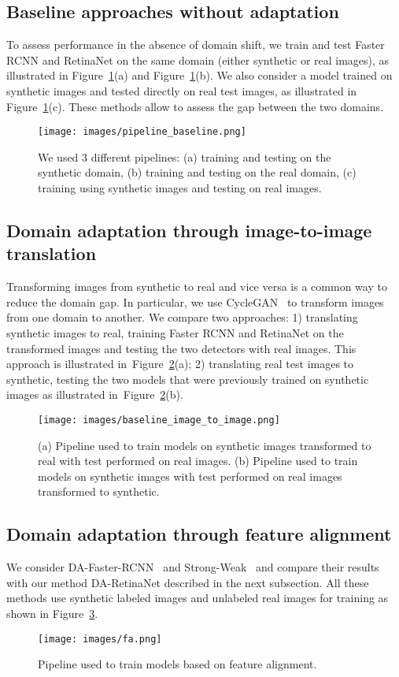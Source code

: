 \documentclass[preprint]{elsarticle}
\begin{document}
\subsection{Baseline approaches without adaptation}
To assess performance in the absence of domain shift, we train and test Faster RCNN and RetinaNet on the same domain (either synthetic or real images), as illustrated in Figure~\ref{fig:baseline}(a) and Figure~\ref{fig:baseline}(b). We also consider a model trained on synthetic images and tested directly on real test images, as illustrated in Figure~\ref{fig:baseline}(c). These methods allow to assess the gap between the two domains.
\begin{figure}[t]
            \centering
            \texttt{[image: images/pipeline\_baseline.png]}
            \caption{We used 3 different pipelines: (a) training and testing on the synthetic domain, (b) training and testing on the real domain, (c) training using synthetic images and testing on real images.}
            \label{fig:baseline}
\end{figure}
\subsection{Domain adaptation through image-to-image translation}
Transforming images from synthetic to real and vice versa is a common way to reduce the domain gap. In particular, we use CycleGAN~\cite{CycleGAN2017} to transform images from one domain to another. We compare two approaches: 1) translating synthetic images to real, training Faster RCNN and RetinaNet on the transformed images and testing the two detectors with real images. This approach is illustrated in~Figure~\ref{fig:image_to_image_pip}(a); 2) translating real test images to synthetic, testing the two models that were previously trained on synthetic images as illustrated in~Figure~\ref{fig:image_to_image_pip}(b).
\begin{figure}[t]
            \centering
            \texttt{[image: images/baseline\_image\_to\_image.png]}
            \caption{(a) Pipeline used to train models on synthetic images transformed to
real with test performed on real images. (b) Pipeline used to train models on synthetic images with test performed on real images transformed to synthetic.}
\label{fig:image_to_image_pip}
\end{figure}

\subsection{Domain adaptation through feature alignment}
\label{featureAlignment}
We consider DA-Faster-RCNN~\cite{chen2018domain} and Strong-Weak~\cite{Saito_2019} and compare their results with our method DA-RetinaNet described in the next subsection. All these methods use synthetic labeled images and unlabeled real images for training as shown in Figure~\ref{fig:fa}.
\begin{figure}[t]
            \centering
            \texttt{[image: images/fa.png]}
            \caption{Pipeline used to train models based on feature alignment.}
            \label{fig:fa}
\end{figure}
\end{document}
